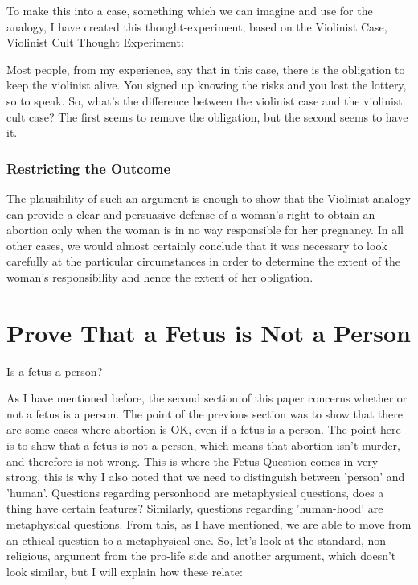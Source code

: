  To make this into a case, something which we can imagine and use for the analogy, I have created this thought-experiment, based on the Violinist Case, Violinist Cult Thought Experiment:


Most people, from my experience, say that in this case, there is the obligation to keep the violinist alive. You signed up knowing the risks and you lost the lottery, so to speak. So, what's the difference between the violinist case and the violinist cult case? The first seems to remove the obligation, but the second seems to have it. 

\subsubsection{Restricting the Outcome}

The plausibility of such an argument is enough to show that the Violinist analogy can provide a clear and persuasive defense of a woman’s right to obtain an abortion only when the woman is in no way responsible for her pregnancy. In all other cases, we would almost certainly conclude that it was necessary to look carefully at the particular circumstances in order to determine the extent of the woman’s responsibility and hence the extent of her obligation.

\section{Prove That a Fetus is Not a Person}
\begin{center}Is a fetus a person?\end{center}

As I have mentioned before, the second section of this paper concerns whether or not a fetus is a person. The point of the previous section was to show that there are some cases where abortion is OK, even if a fetus is a person. The point here is to show that a fetus is not a person, which means that abortion isn't murder, and therefore is not wrong. This is where the Fetus Question comes in very strong, this is why I also noted that we need to distinguish between 'person' and 'human'. Questions regarding personhood are metaphysical questions, does a thing have certain features? Similarly, questions regarding 'human-hood' are metaphysical questions. From this, as I have mentioned, we are able to move from an ethical question to a metaphysical one. So, let's look at the standard, non-religious, argument from the pro-life side and another argument, which doesn't look similar, but I will explain how these relate:

